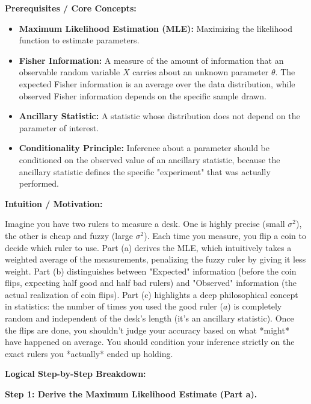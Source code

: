 \begin{solution}
\textbf{Prerequisites / Core Concepts:}
\begin{itemize}
    \item \textbf{Maximum Likelihood Estimation (MLE):} Maximizing the likelihood function to estimate parameters.
    \item \textbf{Fisher Information:} A measure of the amount of information that an observable random variable $X$ carries about an unknown parameter $\theta$. The expected Fisher information is an average over the data distribution, while observed Fisher information depends on the specific sample drawn.
    \item \textbf{Ancillary Statistic:} A statistic whose distribution does not depend on the parameter of interest.
    \item \textbf{Conditionality Principle:} Inference about a parameter should be conditioned on the observed value of an ancillary statistic, because the ancillary statistic defines the specific "experiment" that was actually performed.
\end{itemize}

\textbf{Intuition / Motivation:}

Imagine you have two rulers to measure a desk. One is highly precise (small $\sigma^2$), the other is cheap and fuzzy (large $\sigma^2$). Each time you measure, you flip a coin to decide which ruler to use. 
Part (a) derives the MLE, which intuitively takes a weighted average of the measurements, penalizing the fuzzy ruler by giving it less weight.
Part (b) distinguishes between "Expected" information (before the coin flips, expecting half good and half bad rulers) and "Observed" information (the actual realization of coin flips). 
Part (c) highlights a deep philosophical concept in statistics: the number of times you used the good ruler ($a$) is completely random and independent of the desk's length (it's an ancillary statistic). Once the flips are done, you shouldn't judge your accuracy based on what *might* have happened on average. You should condition your inference strictly on the exact rulers you *actually* ended up holding.

\textbf{Logical Step-by-Step Breakdown:}

\textbf{Step 1: Derive the Maximum Likelihood Estimate (Part a).}


\end{solution}
